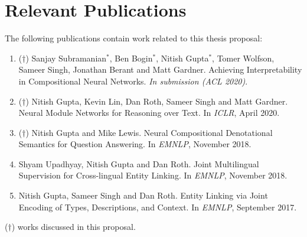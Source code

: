 \documentclass{article}
\begin{document}
\section*{Relevant Publications}

The following publications contain work related to this thesis proposal:

\begin{enumerate}


\item ($\dagger$) Sanjay Subramanian$^{*}$, Ben Bogin$^{*}$, Nitish Gupta$^{*}$, Tomer Wolfson, Sameer Singh, Jonathan Berant and Matt Gardner. Achieving Interpretability in Compositional Neural Networks. \textit{In submission (ACL 2020)}.

\item ($\dagger$) Nitish Gupta, Kevin Lin, Dan Roth, Sameer Singh and Matt Gardner. Neural Module Networks for Reasoning over Text. In \textit{ICLR}, April 2020.

\item ($\dagger$) Nitish Gupta and Mike Lewis. Neural Compositional Denotational Semantics for Question Answering. In \textit{EMNLP}, November 2018.

\item Shyam Upadhyay, Nitish Gupta and Dan Roth. Joint Multilingual Supervision for Cross-lingual Entity Linking. In \textit{EMNLP}, November 2018.

\item Nitish Gupta, Sameer Singh and Dan Roth. Entity Linking via Joint Encoding of Types, Descriptions, and Context. In \textit{EMNLP}, September 2017.

\end{enumerate}

\noindent
($\dagger$) works discussed in this proposal.



\end{document}
